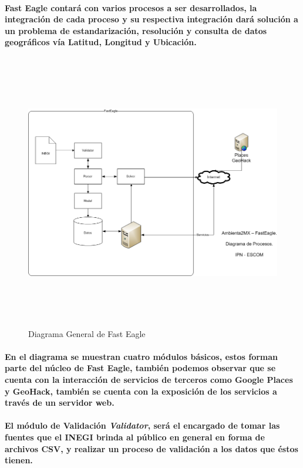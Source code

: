       \paragraph{Fast Eagle contará con varios procesos a ser desarrollados, la integración de cada proceso y su respectiva integración dará solución a un problema de estandarización, resolución y consulta de datos geográficos vía Latitud, Longitud y Ubicación.}
    \newpage
      \begin{landscape}
        \begin{figure}[h!]
        \centering
        \includegraphics[width=22.5cm,height=12cm]{./images/DiagramaFastEagle.png}
        \caption{Diagrama General de Fast Eagle}
      \end{figure}
      \end{landscape}
    \newpage
    \paragraph{En el diagrama se muestran cuatro módulos básicos, estos forman parte del núcleo de Fast Eagle, también podemos observar que se cuenta con la interacción de servicios de terceros como Google Places y GeoHack, también se cuenta con la exposición de los servicios a través de un servidor  web.}
    \paragraph{El módulo de Validación \textbf{\emph{Validator}}, será el encargado de tomar las fuentes que el INEGI brinda al público en general en forma de archivos CSV, y realizar un proceso de validación a los datos que éstos tienen.}
